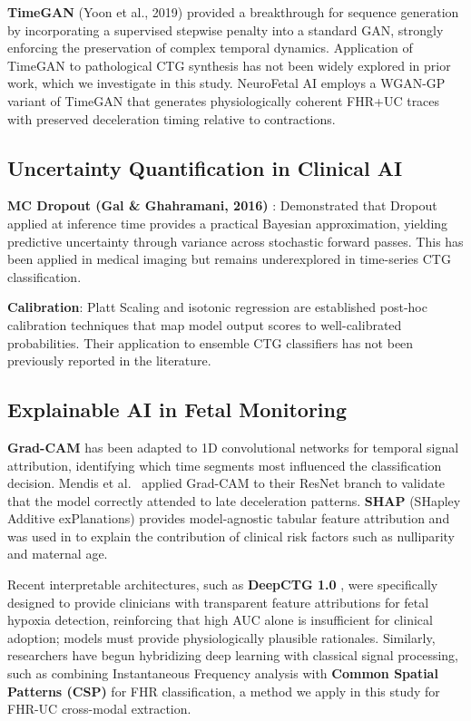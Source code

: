 \documentclass[conference]{IEEEtran}
\begin{document}
\textbf{TimeGAN} (Yoon et al., 2019) \cite{yoon2019} provided a breakthrough for sequence generation by incorporating a supervised stepwise penalty into a standard GAN, strongly enforcing the preservation of complex temporal dynamics. Application of TimeGAN
to pathological CTG synthesis has not been widely explored in prior work,
which we investigate in this study. NeuroFetal AI
employs a WGAN-GP variant of TimeGAN that generates physiologically coherent
FHR+UC traces with preserved deceleration timing relative to contractions.

\subsection{Uncertainty Quantification in Clinical AI}

\textbf{MC Dropout (Gal \& Ghahramani, 2016)} \cite{gal2016}: Demonstrated
that Dropout applied at inference time provides a practical Bayesian
approximation, yielding predictive uncertainty through variance across
stochastic forward passes. This has been applied in medical imaging
\cite{kendall2017} but remains underexplored in time-series CTG classification.

\textbf{Calibration}: Platt Scaling \cite{platt1999} and isotonic regression
are established post-hoc calibration techniques that map model output scores to
well-calibrated probabilities. Their application to ensemble CTG classifiers
has not been previously reported in the literature.

\subsection{Explainable AI in Fetal Monitoring}

\textbf{Grad-CAM} \cite{selvaraju2017} has been adapted to 1D convolutional
networks for temporal signal attribution, identifying which time segments most
influenced the classification decision. Mendis et al.\ \cite{mendis2023}
applied Grad-CAM to their ResNet branch to validate that the model correctly
attended to late deceleration patterns. \textbf{SHAP} (SHapley Additive
exPlanations) \cite{lundberg2017} provides model-agnostic tabular feature
attribution and was used in \cite{mendis2023} to explain the contribution of
clinical risk factors such as nulliparity and maternal age.

Recent interpretable architectures, such as \textbf{DeepCTG 1.0} \cite{deepctg2022},
were specifically designed to provide clinicians with transparent feature
attributions for fetal hypoxia detection, reinforcing that high AUC alone is
insufficient for clinical adoption; models must provide physiologically
plausible rationales. Similarly, researchers have begun hybridizing deep learning
with classical signal processing, such as combining Instantaneous Frequency analysis
with \textbf{Common Spatial Patterns (CSP)} \cite{csp2023} for FHR classification,
a method we apply in this study for FHR-UC cross-modal extraction.
\end{document}
